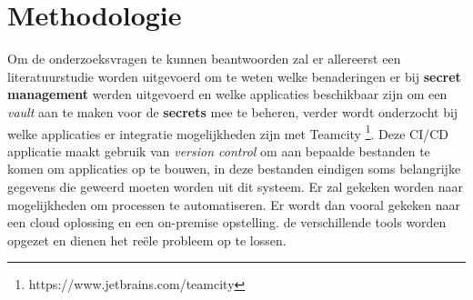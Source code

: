 


\section{Methodologie}
\label{sec:methodologie}


Om de onderzoeksvragen te kunnen beantwoorden zal er allereerst een literatuurstudie worden uitgevoerd om te weten welke benaderingen er bij \textbf{secret management} werden uitgevoerd en welke applicaties beschikbaar zijn om een \textit{vault} aan te maken voor de \textbf{secrets} mee te beheren, verder wordt onderzocht bij welke applicaties er integratie mogelijkheden zijn met Teamcity \footnote{https://www.jetbrains.com/teamcity}. Deze CI/CD applicatie maakt gebruik van \textit{version control} om aan bepaalde bestanden te komen om applicaties op te bouwen, in deze bestanden eindigen soms belangrijke gegevens die geweerd moeten worden uit dit systeem. Er zal gekeken worden naar mogelijkheden om processen te automatiseren. Er wordt dan vooral gekeken naar een cloud oplossing en een on-premise opstelling. de verschillende tools worden opgezet en dienen het reële probleem op te lossen.

